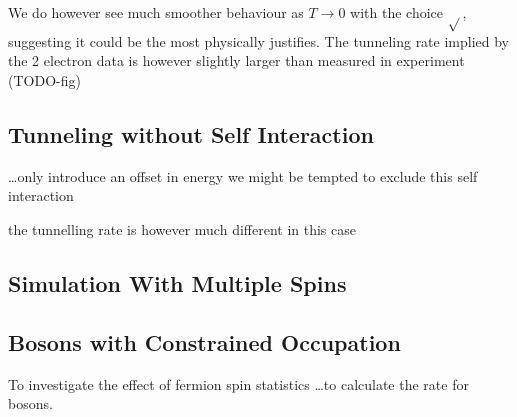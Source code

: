 We do however see much smoother
behaviour as \(T\rightarrow0\)
with the choice \(\sqrt{}\),
suggesting it could be the most
physically justifies. The tunneling rate
implied
by the 2 electron data
is however slightly larger
than measured in experiment (TODO-fig)



\subsection{Tunneling without Self Interaction}
\ldots only introduce an offset in energy
we might be tempted to exclude this self interaction

the tunnelling rate is however much different
in this case





\subsection{Simulation With Multiple Spins}


\subsection{Bosons with Constrained Occupation}
To investigate the effect of fermion spin
statistics \ldots to calculate the rate
for bosons.
